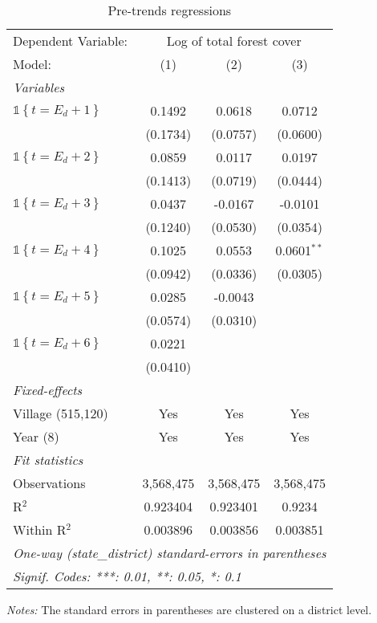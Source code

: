 \begin{table}[htbp]
\centering
\caption{\label{tab:pre-trends_tests} Pre-trends regressions}
\begin{tabular}{lccc}
\tabularnewline\midrule\midrule
Dependent Variable:&\multicolumn{3}{c}{Log of total forest cover}\\
Model:&(1) & (2) & (3)\\
\midrule \emph{Variables}&   &   &  \\
$\mathds{1}\left\{t = E_{d} +1\right\}$&0.1492 & 0.0618 & 0.0712\\
  &(0.1734) & (0.0757) & (0.0600)\\
$\mathds{1}\left\{t = E_{d} +2\right\}$&0.0859 & 0.0117 & 0.0197\\
  &(0.1413) & (0.0719) & (0.0444)\\
$\mathds{1}\left\{t = E_{d} +3\right\}$&0.0437 & -0.0167 & -0.0101\\
  &(0.1240) & (0.0530) & (0.0354)\\
$\mathds{1}\left\{t = E_{d} +4\right\}$&0.1025 & 0.0553 & 0.0601$^{**}$\\
  &(0.0942) & (0.0336) & (0.0305)\\
$\mathds{1}\left\{t = E_{d} +5\right\}$&0.0285 & -0.0043 &   \\
  &(0.0574) & (0.0310) &   \\
$\mathds{1}\left\{t = E_{d} +6\right\}$&0.0221 &    &   \\
  &(0.0410) &    &   \\
\midrule \emph{Fixed-effects}&   &   &  \\
Village (515,120) & Yes & Yes & Yes\\
Year (8) & Yes & Yes & Yes\\
\midrule \emph{Fit statistics}&  & & \\
Observations & 3,568,475&3,568,475&3,568,475\\
R$^2$ & 0.923404&0.923401&0.9234\\
Within R$^2$ & 0.003896&0.003856&0.003851\\
\midrule\midrule\multicolumn{4}{l}{\emph{One-way (state\_district) standard-errors in parentheses}}\\
\multicolumn{4}{l}{\emph{Signif. Codes: ***: 0.01, **: 0.05, *: 0.1}}\\
\end{tabular}

\medskip \emph{Notes:} The standard errors in parentheses are clustered on a district level.
\end{table}

